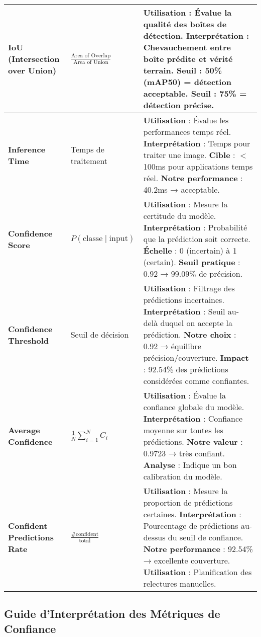 \documentclass[letterpaper, 10 pt, conference]{ieeeconf}
\begin{document}
\begin{table}[h]
\begin{center}
\begin{tabularx}{\textwidth}{|>{\raggedright\arraybackslash}p{2.5cm}|>{\raggedright\arraybackslash}p{3cm}|>{\raggedright\arraybackslash}p{7cm}|}
\hline
\textbf{IoU (Intersection over Union)} & $\frac{\text{Area of Overlap}}{\text{Area of Union}}$ & \textbf{Utilisation} : Évalue la qualité des boîtes de détection. \textbf{Interprétation} : Chevauchement entre boîte prédite et vérité terrain. \textbf{Seuil} : 50\% (mAP50) = détection acceptable. \textbf{Seuil} : 75\% = détection précise. \\
\hline
\textbf{Inference Time} & Temps de traitement & \textbf{Utilisation} : Évalue les performances temps réel. \textbf{Interprétation} : Temps pour traiter une image. \textbf{Cible} : $<$ 100ms pour applications temps réel. \textbf{Notre performance} : 40.2ms → acceptable. \\
\hline
\textbf{Confidence Score} & $P(\text{classe} \mid \text{input})$ & \textbf{Utilisation} : Mesure la certitude du modèle. \textbf{Interprétation} : Probabilité que la prédiction soit correcte. \textbf{Échelle} : 0 (incertain) à 1 (certain). \textbf{Seuil pratique} : 0.92 → 99.09\% de précision. \\
\hline
\textbf{Confidence Threshold} & Seuil de décision & \textbf{Utilisation} : Filtrage des prédictions incertaines. \textbf{Interprétation} : Seuil au-delà duquel on accepte la prédiction. \textbf{Notre choix} : 0.92 → équilibre précision/couverture. \textbf{Impact} : 92.54\% des prédictions considérées comme confiantes. \\
\hline
\textbf{Average Confidence} & $\frac{1}{N} \sum_{i=1}^{N} C_i$ & \textbf{Utilisation} : Évalue la confiance globale du modèle. \textbf{Interprétation} : Confiance moyenne sur toutes les prédictions. \textbf{Notre valeur} : 0.9723 → très confiant. \textbf{Analyse} : Indique un bon calibration du modèle. \\
\hline
\textbf{Confident Predictions Rate} & $\frac{\text{\# confident}}{\text{total}}$ & \textbf{Utilisation} : Mesure la proportion de prédictions certaines. \textbf{Interprétation} : Pourcentage de prédictions au-dessus du seuil de confiance. \textbf{Notre performance} : 92.54\% → excellente couverture. \textbf{Utilisation} : Planification des relectures manuelles. \\
\hline
\end{tabularx}
\end{center}
\end{table}

\subsection{Guide d'Interprétation des Métriques de Confiance}
\end{document}
